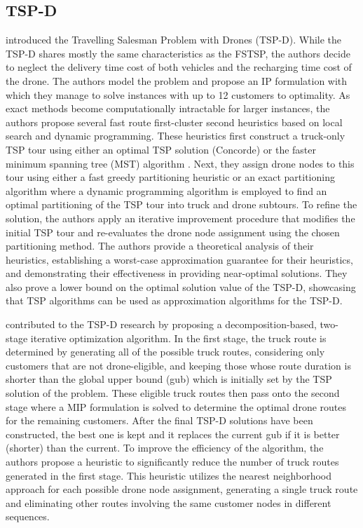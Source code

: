 \documentclass{article}
\begin{document}
	\subsection{TSP-D}
	\citeauthor{Agatz2018} \cite{Agatz2018} introduced the Travelling Salesman Problem with Drones (TSP-D). While the TSP-D shares mostly the same characteristics as the FSTSP, the authors decide to neglect the delivery time cost of both vehicles and the recharging time cost of the drone. The authors model the problem and propose an IP formulation with which they manage to solve instances with up to 12 customers to optimality. As exact methods become computationally intractable for larger instances, the authors propose several fast route first-cluster second heuristics based on local search and dynamic programming. These heuristics first construct a truck-only TSP tour using either an optimal TSP solution (Concorde) or the faster minimum spanning tree (MST) algorithm \cite{MST1957}. Next, they assign drone nodes to this tour using either a fast greedy partitioning heuristic or an exact partitioning algorithm where a dynamic programming algorithm is employed to find an optimal partitioning of the TSP tour into truck and drone subtours. 
	To refine the solution, the authors apply an iterative improvement procedure that modifies the initial TSP tour and re-evaluates the drone node assignment using the chosen partitioning method. The authors provide a theoretical analysis of their heuristics, establishing a worst-case approximation guarantee for their heuristics, and demonstrating their effectiveness in providing near-optimal solutions. They also prove a lower bound on the optimal solution value of the TSP-D, showcasing that TSP algorithms can be used as approximation algorithms for the TSP-D.
	\par
	\citeauthor{Yurek2018} \cite{Yurek2018} contributed to the TSP-D research by proposing a decomposition-based, two-stage iterative optimization algorithm. In the first stage, the truck route is determined by generating all of the possible truck routes, considering only customers that are not drone-eligible, and keeping those whose route duration is shorter than the global  upper bound (gub) which is initially set by the TSP solution of the problem. These eligible truck routes then pass onto the second stage where a MIP formulation is solved to determine the optimal drone routes for the remaining customers. After the final TSP-D solutions have been constructed, the best one is kept and it replaces the current gub if it is better (shorter) than the current. To improve the efficiency of the algorithm, the authors propose a heuristic to significantly reduce the number of truck routes generated in the first stage. This heuristic utilizes the nearest neighborhood approach for each possible drone node assignment, generating a single truck route and eliminating other routes involving the same customer nodes in different sequences.
\end{document}

